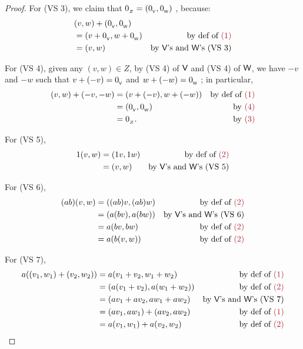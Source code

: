 \begin{proof}
For (VS 3), we claim that \(0_{_Z} = (0_{_{\textsf{V}}}, 0_{_{\textsf{W}}})\) , because:
\begin{align*}
    & (v, w) + (\OV, \OW) \\
    & = (v + \OV, w + \OW) & \text{by def of \MAROON{(1)}} \\
    & = (v, w) & \text{by \(\V\)'s and \(\W\)'s (VS 3)}
\end{align*}

For (VS 4), given any \((v, w) \in Z\), by (VS 4) of \(\textsf{V}\) and (VS 4) of \(\textsf{W}\), we have \(-v\) and \(-w\) such that \(v + (-v) = 0_{_{\textsf{V}}}\) and \(w + (-w) = 0_{_{\textsf{W}}}\) ;
in particular,
\begin{align*}
    (v, w) + (-v, -w) & = (v + (-v), w + (-w)) & \text{by def of \MAROON{(1)}} \\
                      & = (\OV, \OW) & \text{by \MAROON{(4)}} \\
                      & = 0_{_Z}. & \text{by \MAROON{(3)}}
\end{align*}

For (VS 5),
\begin{align*}
    1 (v, w) & = (1v, 1w) & \text{by def of \MAROON{(2)}} \\
             & = (v, w) & \text{by \(\V\)'s and \(\W\)'s (VS 5)}
\end{align*}

For (VS 6),
\begin{align*}
    (ab) (v, w) & = ((ab) v, (ab) w) & \text{by def of \MAROON{(2)}} \\
                & = (a(bv), a(bw)) & \text{by \(\V\)'s and \(\W\)'s (VS 6)} \\
                & = a(bv, bw) & \text{by def of \MAROON{(2)}} \\
                & = a(b(v, w)) & \text{by def of \MAROON{(2)}}
\end{align*}
    
For (VS 7),
\begin{align*}
    a((v_1, w_1) + (v_2, w_2)) & = a(v_1 + v_2, w_1 + w_2) & \text{by def of \MAROON{(1)}} \\
                               & = (a(v_1 + v_2), a(w_1 + w_2)) & \text{by def of \MAROON{(2)}} \\
                               & = (a v_1 + a v_2, a w_1 + a w_2) & \text{by \(\V\)'s and \(\W\)'s (VS 7)} \\
                               & = (a v_1, a w_1) + (a v_2, a w_2) & \text{by def of \MAROON{(1)}} \\
                               & = a(v_1, w_1) + a(v_2, w_2) & \text{by def of \MAROON{(2)}}
\end{align*}
    

\end{proof}
